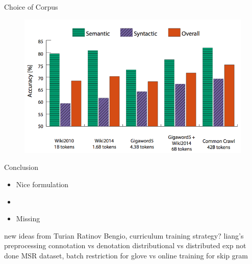 \begin{frame}{Choice of Corpus}
  \begin{figure}
    \centering
    \includegraphics[scale=0.4]{images/corpus.png}
  \end{figure}
\end{frame}

\begin{frame}{Conclusion}
  \begin{itemize}
  \item Nice formulation
  \item 
  \item Missing 
  \end{itemize}
  new ideas from Turian Ratinov Bengio,
  curriculum training strategy?
  liang's preprocessing
  connotation vs denotation
  distributional vs distributed
  exp not done MSR dataset,
  batch restriction for glove vs online training for skip gram
\end{frame}
